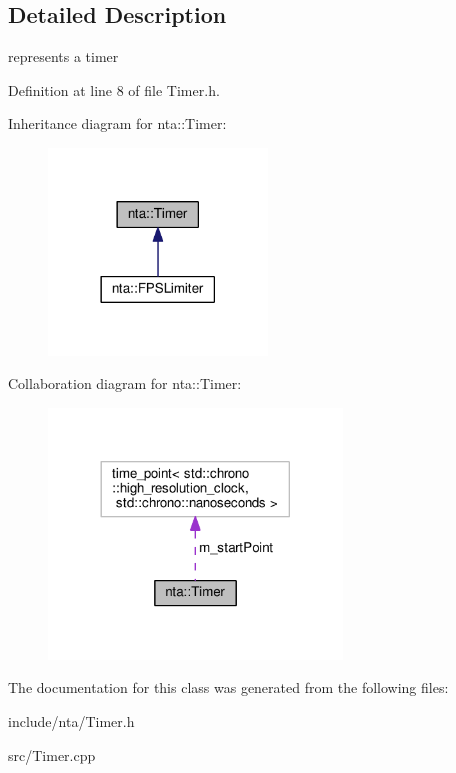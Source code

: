 \subsection{Detailed Description}
represents a timer 

Definition at line 8 of file Timer.\+h.



Inheritance diagram for nta\+:\+:Timer\+:
\nopagebreak
\begin{figure}[H]
\begin{center}
\leavevmode
\includegraphics[width=165pt]{d3/d1b/classnta_1_1Timer__inherit__graph}
\end{center}
\end{figure}


Collaboration diagram for nta\+:\+:Timer\+:
\nopagebreak
\begin{figure}[H]
\begin{center}
\leavevmode
\includegraphics[width=221pt]{d3/def/classnta_1_1Timer__coll__graph}
\end{center}
\end{figure}


The documentation for this class was generated from the following files\+:\begin{DoxyCompactItemize}
\item 
include/nta/Timer.\+h\item 
src/Timer.\+cpp\end{DoxyCompactItemize}
